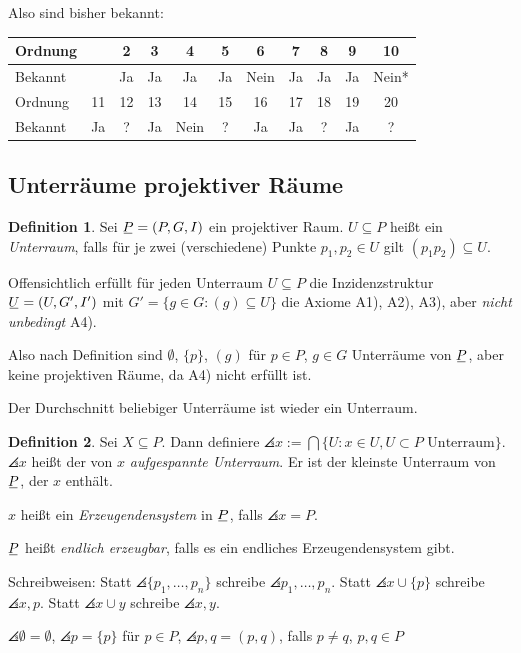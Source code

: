 \documentclass[
 a4paper,
 12pt,
 parskip=half
 ]{scrartcl}
\theoremstyle{plain}
\theoremstyle{definition}
\newtheorem*{defn*}{Definition}
\begin{document}
Also sind bisher bekannt:
\begin{center}\begin{tabular}{l|c|c|c|c|c|c|c|c|c|c}
 Ordnung &    & 2  & 3  & 4  & 5  & 6    & 7  & 8  & 9  & 10 \\
 \hline
 Bekannt &    & Ja & Ja & Ja & Ja & Nein & Ja & Ja & Ja & Nein* \\[5pt]
 Ordnung & 11 & 12 & 13 & 14 & 15 & 16 & 17 & 18 & 19 & 20 \\
 \hline
 Bekannt & Ja & ?  & Ja & Nein & ? & Ja & Ja & ? & Ja & ?
\end{tabular}\end{center}

\subsection{Unterräume projektiver Räume}
\begin{defn*}
 Sei $\proj = (P,G,I)$ ein projektiver Raum. $U \subseteq P$ heißt ein \emph{Unterraum}, falls für je zwei (verschiedene) Punkte $p_1, p_2 \in U$ gilt $(p_1 p_2) \subseteq U$.
\end{defn*}

Offensichtlich erfüllt für jeden Unterraum $U \subseteq P$ die Inzidenzstruktur $\ubar{U} = (U,G',I')$ mit $G' = \{ g \in G : (g) \subseteq U \}$ die Axiome A1), A2), A3), aber \emph{nicht unbedingt} A4).

Also nach Definition sind $\emptyset$, $\{ p \}$, $(g)$ für $p \in P$, $g \in G$ Unterräume von $\proj$, aber keine projektiven Räume, da A4) nicht erfüllt ist. 

Der Durchschnitt beliebiger Unterräume ist wieder ein Unterraum.

\begin{defn*}
 Sei $X \subseteq P$. Dann definiere $\angles{x} := \bigcap \{ U : x \in U, U \subset P \text{ Unterraum} \}$. $\angles{x}$ heißt der von $x$ \emph{aufgespannte Unterraum}. Er ist der kleinste Unterraum von $\proj$, der $x$ enthält.
 
 $x$ heißt ein \emph{Erzeugendensystem} in $\proj$, falls $\angles{x} = P$.
 
 $\proj$ heißt \emph{endlich erzeugbar}, falls es ein endliches Erzeugendensystem gibt.
 
 Schreibweisen: Statt $\angles{ \{p_1, \ldots, p_n \} }$ schreibe $\angles{ p_1, \ldots, p_n }$. Statt $\angles{ x \cup \{p\} }$ schreibe $\angles{x,p}$. Statt $\angles{x \cup y}$ schreibe $\angles{x,y}$.
 
 $\angles{ \emptyset } = \emptyset$, $\angles{ p } = \{ p \}$ für $p \in P$, $\angles{ p,q } = ( p,q )$, falls $p \ne q$, $p,q \in P$
\end{defn*}
\end{document}
